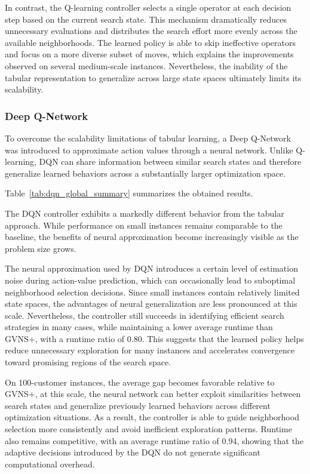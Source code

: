 In contrast, the Q-learning controller selects a single operator at each decision step based on the current search state. This mechanism dramatically reduces unnecessary evaluations and distributes the search effort more evenly across the available neighborhoods. The learned policy is able to skip ineffective operators and focus on a more diverse subset of moves, which explains the improvements observed on several medium-scale instances. Nevertheless, the inability of the tabular representation to generalize across large state spaces ultimately limits its scalability.

\subsubsection{Deep Q-Network}
To overcome the scalability limitations of tabular learning, a Deep Q-Network was introduced to approximate action values through a neural network. Unlike Q-learning, DQN can share information between similar search states and therefore generalize learned behaviors across a substantially larger optimization space.

Table~\ref{tab:dqn_global_summary} summarizes the obtained results.


The DQN controller exhibits a markedly different behavior from the tabular approach. While performance on small instances remains comparable to the baseline, the benefits of neural approximation become increasingly visible as the problem size grows. 

The neural approximation used by DQN introduces a certain level of estimation noise during action-value prediction, which can occasionally lead to suboptimal neighborhood selection decisions. Since small instances contain relatively limited state spaces, the advantages of neural generalization are less pronounced at this scale. Nevertheless, the controller still succeeds in identifying efficient search strategies in many cases, while maintaining a lower average runtime than GVNS+, with a runtime ratio of 0.80. This suggests that the learned policy helps reduce unnecessary exploration for many instances and accelerates convergence toward promising regions of the search space. 

On 100-customer instances, the average gap becomes favorable relative to GVNS+, at this scale, the neural network can better exploit similarities between search states and generalize previously learned behaviors across different optimization situations. As a result, the controller is able to guide neighborhood selection more consistently and avoid inefficient exploration patterns. Runtime also remains competitive, with an average runtime ratio of 0.94, showing that the adaptive decisions introduced by the DQN do not generate significant computational overhead. 


